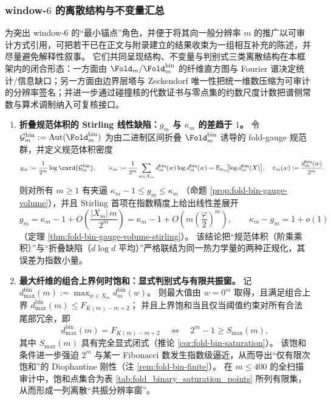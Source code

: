 \subsubsection{window-\texorpdfstring{\(6\)}{6} 的离散结构与不变量汇总}\label{subsubsec:window6-discrete-results}
为突出 window-\(6\) 的“最小锚点”角色，并便于将其向一般分辨率 \(m\) 的推广以可审计方式引用，可把若干已在正文与附录建立的结果收束为一组相互补充的陈述，并尽量避免解释性叙事。
它们共同呈现结构、不变量与判别式三类离散结构在本框架内的闭合形态：一方面由 \(\Fold_m/\Fold^{\mathrm{bin}}_m\) 的纤维直方图与 Fourier 谱决定统计/信息缺口；另一方面由边界层塔与 Zeckendorf 唯一性把统一维数压缩为可审计的分辨率签名；并进一步通过碰撞核的代数证书与零点集的约数尺度计数把谱侧常数与算术调制纳入可复核接口。

\begin{enumerate}
  \item \textbf{折叠规范体积的 Stirling 线性缺陷：\texorpdfstring{$g_m$}{gm} 与 \texorpdfstring{$\kappa_m$}{kappa} 的差趋于 \(1\)。}
  令
  \(\mathcal{G}^{\mathrm{bin}}_m:=\mathrm{Aut}(\Fold^{\mathrm{bin}}_m)\)
  为由二进制区间折叠 \(\Fold^{\mathrm{bin}}_m\) 诱导的 fold-gauge 规范群，并定义规范体积密度
  \[
  g_m:=\frac{1}{2^m}\log\card{\mathcal{G}^{\mathrm{bin}}_m},
  \qquad
  \kappa_m
  :=\frac{1}{2^m}\sum_{w\in X_m}d^{\mathrm{bin}}_m(w)\log d^{\mathrm{bin}}_m(w)
  =\mathbb{E}_{\pi_m}\!\bigl[\log d^{\mathrm{bin}}_m(X)\bigr],
  \quad
  \pi_m(w):=\frac{d^{\mathrm{bin}}_m(w)}{2^m}.
  \]
  则对所有 \(m\ge 1\) 有夹逼
  \(
  \kappa_m-1\le g_m\le \kappa_m
  \)
  （命题 \ref{prop:fold-bin-gauge-volume}），并且 Stirling 首项在指数精度上给出线性差展开
  \[
  g_m=\kappa_m-1+O\!\left(\frac{|X_m|\,m}{2^m}\right)
  =\kappa_m-1+O\!\left(m\left(\frac{\varphi}{2}\right)^m\right),
  \qquad
  \kappa_m-g_m=1+o(1)
  \]
  （定理 \ref{thm:fold-bin-gauge-volume-stirling}）。
  该结论把“规范体积（阶乘乘积）”与“折叠缺陷（\(d\log d\) 平均）”严格联结为同一热力学量的两种正规化，其误差为指数小量。

  \item \textbf{最大纤维的组合上界何时饱和：显式判别式与有限共振窗。}
  记
  \(d^{\mathrm{bin}}_{\max}(m):=\max_{w\in X_m}d^{\mathrm{bin}}_m(w)\)。
  则最大值由 \(w=0^m\) 取得，且满足组合上界
  \(d^{\mathrm{bin}}_{\max}(m)\le F_{K(m)-m+2}\)；
  并且上界饱和当且仅当阈值约束对所有合法尾部冗余，即
  \[
  d^{\mathrm{bin}}_{\max}(m)=F_{K(m)-m+2}
  \quad\Longleftrightarrow\quad
  2^m-1\ge S_{\max}(m),
  \]
  其中 \(S_{\max}(m)\) 具有完全显式闭式（推论 \ref{cor:fold-bin-saturation}）。
  该饱和条件进一步强迫 \(2^m\) 与某一 Fibonacci 数发生指数级逼近，从而导出“仅有限次饱和”的 Diophantine 刚性（注 \ref{rem:fold-bin-finite}）。
  在 \(m\le 400\) 的全扫描审计中，饱和点集合为表 \ref{tab:fold_binary_saturation_points} 所列有限集，从而形成一列离散“共振分辨率窗”。


\end{enumerate}
